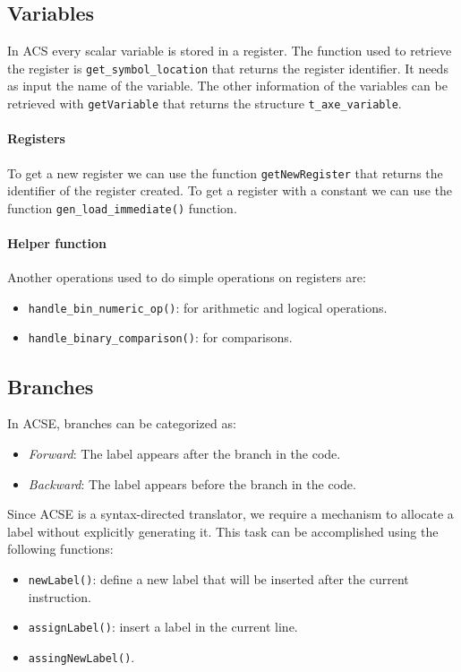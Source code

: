 \subsection{Variables}
In ACS every scalar variable is stored in a register. 
The function used to retrieve the register is \texttt{get\_symbol\_location} that returns the register identifier. 
It needs as input the name of the variable. 
The other information of the variables can be retrieved with \texttt{getVariable} that returns the structure \texttt{t\_axe\_variable}. 

\paragraph*{Registers}
To get a new register we can use the function \texttt{getNewRegister} that returns the identifier of the register created. 
To get a register with a constant we can use the function \texttt{gen\_load\_immediate()} function. 

\paragraph*{Helper function}
Another operations used to do simple operations on registers are: 
\begin{itemize}
    \item \texttt{handle\_bin\_numeric\_op()}: for arithmetic and logical operations. 
    \item \texttt{handle\_binary\_comparison()}: for comparisons. 
\end{itemize}

\subsection{Branches}
In ACSE, branches can be categorized as:
\begin{itemize}
    \item \textit{Forward}: The label appears after the branch in the code.
    \item \textit{Backward}: The label appears before the branch in the code.
\end{itemize}

Since ACSE is a syntax-directed translator, we require a mechanism to allocate a label without explicitly generating it. 
This task can be accomplished using the following functions:
\begin{itemize}
    \item \texttt{newLabel()}: define a new label that will be inserted after the current instruction. 
    \item \texttt{assignLabel()}: insert a label in the current line. 
    \item \texttt{assingNewLabel()}.
\end{itemize}